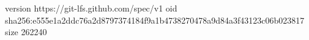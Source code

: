 version https://git-lfs.github.com/spec/v1
oid sha256:e555e1a2ddc76a2d8797374184f9a1b4738270478a9d84a3f43123c06b023817
size 262240
